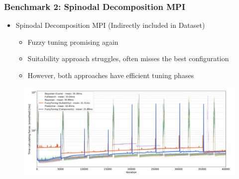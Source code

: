 \documentclass[
	10pt,
	t		%
]{beamer}
\begin{document}
\begin{frame}
	\frametitle{Benchmark 2: Spinodal Decomposition MPI}

	\begin{itemize}
		\item Spinodal Decomposition MPI (Indirectly included in Dataset)
		      \begin{itemize}
			      \item Fuzzy tuning promising again
			      \item Suitability approach struggles, often misses the best configuration
			      \item However, both approaches have efficient tuning phases
		      \end{itemize}
	\end{itemize}

	\begin{figure}
		\centering
		\includegraphics[width=1\textwidth]{figures/spinodal-timings.png}
	\end{figure}
\end{frame}
\end{document}
